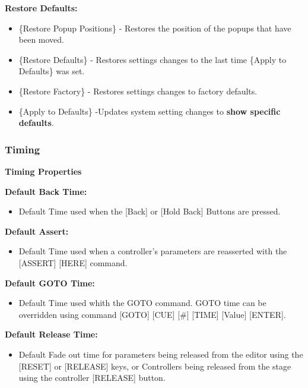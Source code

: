 \documentclass[
]{article}
\providecommand{\tightlist}{%
  \setlength{\itemsep}{0pt}\setlength{\parskip}{0pt}}
\begin{document}
\textbf{Restore Defaults:}

\begin{itemize}
\item
  \{Restore Popup Positions\} - Restores the position of the popups that have been moved.
\item
  \{Restore Defaults\} - Restores settings changes to the last time \{Apply to Defaults\} was set.
\item
  \{Restore Factory\} - Restores settings changes to factory defaults.
\item
  \{Apply to Defaults\} -Updates system setting changes to \textbf{show specific defaults}.
\end{itemize}

\hypertarget{timing}{%
\subsubsection{Timing}\label{timing}}

\textbf{Timing Properties}

\textbf{Default Back Time:}

\begin{itemize}
\tightlist
\item
  Default Time used when the {[}Back{]} or {[}Hold Back{]} Buttons are pressed.
\end{itemize}

\textbf{Default Assert:}

\begin{itemize}
\tightlist
\item
  Default Time used when a controller's parameters are reasserted with the {[}ASSERT{]} {[}HERE{]} command.
\end{itemize}

\textbf{Default GOTO Time:}

\begin{itemize}
\tightlist
\item
  Default Time used whith the GOTO command. GOTO time can be overridden using command {[}GOTO{]} {[}CUE{]} {[}\#{]} {[}TIME{]} {[}Value{]} {[}ENTER{]}.
\end{itemize}

\textbf{Default Release Time:}

\begin{itemize}
\tightlist
\item
  Default Fade out time for parameters being released from the editor using the {[}RESET{]} or {[}RELEASE{]} keys, or Controllers being released from the stage using the controller {[}RELEASE{]} button.
\end{itemize}
\end{document}
